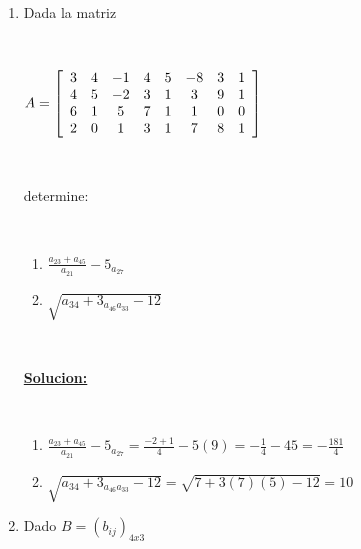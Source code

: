 \documentclass[11pt, conference]{IEEEtran}
\begin{document}
{\begin{enumerate}
\

Para determinar el numero de columnas de la matriz D, tomemos los elementos de la primera fila 1, 3, 5, ... , 97, donde se observaque estos son numeros impares consecutivos.

En consecuencia existe 49 numeros. Por tanto la matriz tiene 49 columnas.

\

En forma analoga, para determinar el numero de filas de la matriz D tomemos los elemntos de la primera columna 1, 4, 7 , ... ,31, donde estos numeros forman una progresion aritmetica. Entonces se tiene la siguiente formula $ a_n = a_1+(n-1)r $, donde $ a_n $ = 31(ultimo elemento) y la razon es r = 3. Entonces:
\begin{eqnarray}
  a_n = a_1+(n+1)r \nonumber \\
(n-1)r = a_n - a_1 \nonumber \\
n = {\frac{a_n - a_1}{r}} +1 \nonumber \\
n = {\frac{30}{3}} + 1 \nonumber\\
n = 11 \nonumber \\
\end{eqnarray}

Por lo tanto la matriz es de 11 filas.

Finalmente la matriz D es de orden 11 x 49

\item
Dada la matriz 

\

$ A = \left[\begin{array}{c c c c c c c c} 3&4&-1&4&5&-8&3&1\\4&5&-2&3&1&3&9&1\\6&1&5&7&1&1&0&0\\2&0&1&3&1&7&8&1 \end{array} \right]$ 

\

determine:

\

\begin{enumerate}
\item ${\frac{a_{23} + a_{45} }{a_{21} }} - 5_{ a_{27}}$
\item $ \sqrt{a_{34}+3_{a_{46}a_{33} }-12 } $
\end{enumerate}

\

{\bf \underline{Solucion:} }

\

\begin{enumerate}
\item ${\frac{a_{23} + a_{45} }{a_{21} }} - 5_{ a_{27}} = {\frac{-2+1}{4}}-5(9)=-{\frac{1}{4}}-45=-{\frac{181}{4}} $
\item $ \sqrt{a_{34}+3_{a_{46}a_{33} }-12 } =\sqrt{7+3(7)(5)-12} =10 $
\end{enumerate}
\item
Dado $B=(b_{ij})_{4x3} $


\end{enumerate}}
\end{document}
